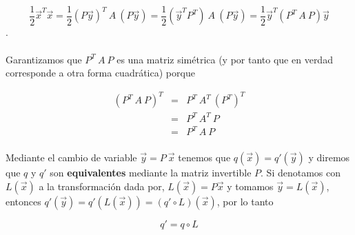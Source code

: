 \begin{equation*}
    \frac{1}{2}\overrightarrow{x}^{T}\overrightarrow{x} = \frac{1}{2}\left(P\overrightarrow{y}\right)^{T}~A~\left(P\overrightarrow{y}\right) = \frac{1}{2}\left(\overrightarrow{y}^{T} P^{T}\right)~A~\left(P\overrightarrow{y}\right) = \frac{1}{2}\overrightarrow{y}^{T}\left(P^{T}~A~P\right)\overrightarrow{y}
\end{equation*}.

\paragraph*{}
Garantizamos que $P^{T}~A~P$ es una matriz simétrica (y por tanto que en verdad corresponde a otra forma cuadrática) porque

\begin{eqnarray*}
\left(P^{T}~A~P\right)^{T}&=&P^{T}~A^{T}~\left(P^{T}\right)^{T}\\
&=&P^{T}~A^{T}~P\\
&=&P^{T}~A~P
\end{eqnarray*}

\paragraph*{}
Mediante el cambio de variable $\overrightarrow{y} = P~\overrightarrow{x}$ tenemos que $q(\overrightarrow{x}) = q'(\overrightarrow{y})$ y diremos que $q$ y $q'$ son \textbf{equivalentes} mediante la matriz invertible $P$. Si denotamos con $L(\overrightarrow{x})$ a la transformación dada por, $L(\overrightarrow{x}) = P\overrightarrow{x}$ y tomamos $\overrightarrow{y} = L(\overrightarrow{x})$, entonces $q'(\overrightarrow{y}) = q'\left(L(\overrightarrow{x})\right) = \left(q' \circ L\right)(\overrightarrow{x})$, por lo tanto

\begin{equation*}
q' = q \circ L
\end{equation*}


